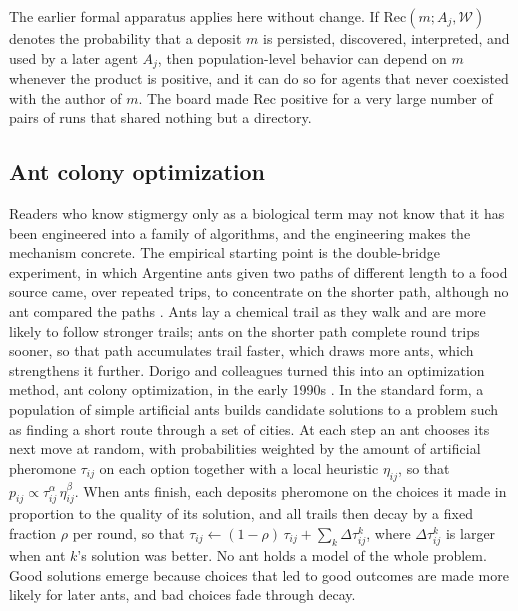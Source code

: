 \documentclass[11pt]{article}
\theoremstyle{remark}
\newcommand{\W}{\mathcal{W}}
\newcommand{\Rec}{\mathrm{Rec}}
\begin{document}
The earlier formal apparatus applies here without change. If $\Rec(m; A_j, \W)$ denotes the probability that a deposit $m$ is persisted, discovered, interpreted, and used by a later agent $A_j$, then population-level behavior can depend on $m$ whenever the product is positive, and it can do so for agents that never coexisted with the author of $m$. The board made $\Rec$ positive for a very large number of pairs of runs that shared nothing but a directory.

\subsection{Ant colony optimization}

Readers who know stigmergy only as a biological term may not know that it has been engineered into a family of algorithms, and the engineering makes the mechanism concrete. The empirical starting point is the double-bridge experiment, in which Argentine ants given two paths of different length to a food source came, over repeated trips, to concentrate on the shorter path, although no ant compared the paths \cite{goss1989,deneubourg1990}. Ants lay a chemical trail as they walk and are more likely to follow stronger trails; ants on the shorter path complete round trips sooner, so that path accumulates trail faster, which draws more ants, which strengthens it further. Dorigo and colleagues turned this into an optimization method, ant colony optimization, in the early 1990s \cite{dorigo1996,dorigo2004}. In the standard form, a population of simple artificial ants builds candidate solutions to a problem such as finding a short route through a set of cities. At each step an ant chooses its next move at random, with probabilities weighted by the amount of artificial pheromone $\tau_{ij}$ on each option together with a local heuristic $\eta_{ij}$, so that $p_{ij} \propto \tau_{ij}^{\alpha}\,\eta_{ij}^{\beta}$. When ants finish, each deposits pheromone on the choices it made in proportion to the quality of its solution, and all trails then decay by a fixed fraction $\rho$ per round, so that $\tau_{ij} \leftarrow (1-\rho)\,\tau_{ij} + \sum_k \Delta\tau^{k}_{ij}$, where $\Delta\tau^{k}_{ij}$ is larger when ant $k$'s solution was better. No ant holds a model of the whole problem. Good solutions emerge because choices that led to good outcomes are made more likely for later ants, and bad choices fade through decay.
\end{document}
